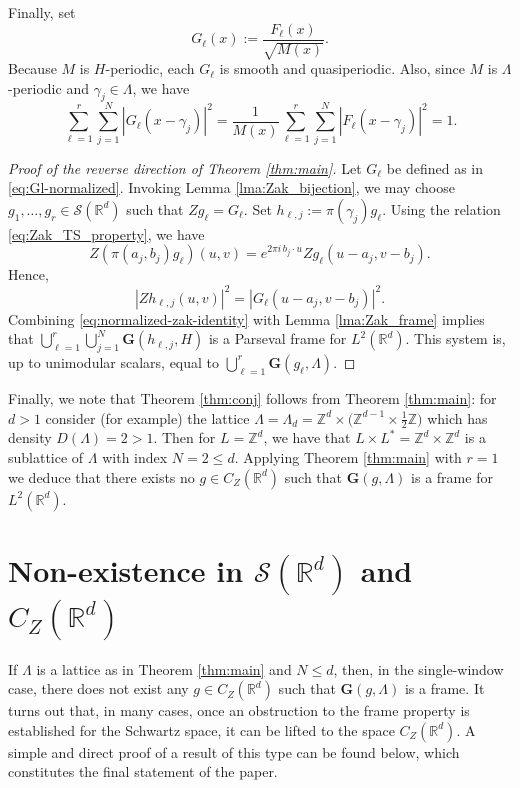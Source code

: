 \documentclass[reqno,a4paper,12pt]{amsart}
\numberwithin{equation}{section}
\def\Z{{\mathbb Z}}
\def\R{{\mathbb R}}
\newcommand{\Rd}{{\R^d}}
\newcommand{\ltd}{{L^2(\R^d)}}
\newcommand\1{\mathds{1}}
\begin{document}
Finally, set
\begin{equation}\label{eq:Gl-normalized}
    G_\ell(x)
:=
\frac{F_\ell(x)}{\sqrt{M(x)}}.
\end{equation}
Because $M$ is $H$-periodic, each $G_\ell$ is smooth and
quasiperiodic. Also, since $M$ is $\Lambda$-periodic and
$\gamma_j\in\Lambda$, we have
\begin{equation}\label{eq:normalized-zak-identity}
\sum_{\ell=1}^r\sum_{j=1}^N
|G_\ell(x-\gamma_j)|^2  
=
\frac{1}{M(x)}
\sum_{\ell=1}^r\sum_{j=1}^N
|F_\ell(x-\gamma_j)|^2  
=
1.
\end{equation}


\begin{proof}[Proof of the reverse direction of Theorem \ref{thm:main}]
Let $G_\ell$ be defined as in \eqref{eq:Gl-normalized}.
    Invoking Lemma \ref{lma:Zak_bijection}, we may choose
$
g_1,\dots,g_r\in\mathcal S(\mathbb R^d)
$
such that
$
Zg_\ell=G_\ell.
$
Set $h_{\ell,j}:=\pi(\gamma_j)g_\ell$. 
Using the relation \eqref{eq:Zak_TS_property}, we have
$$
Z(\pi(a_j,b_j)g_\ell)(u,v)
=
e^{2\pi i\,b_j\cdot u}
Zg_\ell(u-a_j,v-b_j).
$$
Hence,
$$
|Zh_{\ell,j}(u,v)|^2
=
|G_\ell(u-a_j,v-b_j)|^2.
$$
Combining \eqref{eq:normalized-zak-identity}
with Lemma \ref{lma:Zak_frame} implies that
$
\bigcup_{\ell=1}^r\bigcup_{j=1}^N
\mathbf G(h_{\ell,j},H)
$
is a Parseval frame for $L^2(\mathbb R^d)$. This system is, up to unimodular scalars, equal to $\bigcup_{\ell=1}^r
\mathbf G(g_\ell,\Lambda)$.
\end{proof}

Finally, we note that Theorem \ref{thm:conj} follows from Theorem \ref{thm:main}: for $d > 1$ consider (for example) the lattice $\Lambda = \Lambda_d = \mathbb{Z}^d\times\bigl(\mathbb{Z}^{d-1}\times \frac12 \mathbb{Z}\bigr)$ which has density $D(\Lambda)=2>1$. Then for $L=\Z^d$, we have that $L \times L^* = \Z^d \times \Z^d$ is a sublattice of $\Lambda$ with index $N=2 \leq d$. Applying Theorem \ref{thm:main} with $r=1$ we deduce that there exists no $g \in C_Z(\Rd)$ such that $\mathbf{G}(g,\Lambda)$ is a frame for $\ltd$.

\section{Non-existence in $\mathcal{S}(\Rd)$ and $C_Z(\Rd)$}

If $\Lambda$ is a lattice as in Theorem \ref{thm:main} and $N \leq d$, then, in the single-window case, there does not exist any $g \in C_Z(\Rd)$ such that $\mathbf{G}(g,\Lambda)$ is a frame. It turns out that, in many cases, once an obstruction to the frame property is established for the Schwartz space, it can be lifted to the space $C_Z(\Rd)$. A simple and direct proof of a result of this type can be found below, which constitutes the final statement of the paper.
\end{document}
